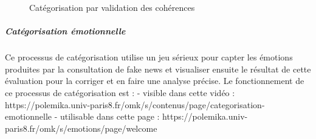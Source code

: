 \documentclass[
  a4paper,
  DIV=11,
  numbers=noendperiod]{scrreprt}
\let\oldsubparagraph\subparagraph
\renewcommand{\subparagraph}[1]{\oldsubparagraph{#1}\mbox{}}
\begin{document}
\begin{figure}


\caption{\label{fig-polemikaReseau}Catégorisation par validation des
cohérences}

\end{figure}%

\subparagraph{Catégorisation
émotionnelle}\label{catuxe9gorisation-uxe9motionnelle}

Ce processus de catégorisation utilise un jeu sérieux pour capter les
émotions produites par la consultation de fake news et visualiser
ensuite le résultat de cette évaluation pour la corriger et en faire une
analyse précise. Le fonctionnement de ce processus de catégorisation est
: - visible dans cette vidéo :
https://polemika.univ-paris8.fr/omk/s/contenus/page/categorisation-emotionnelle
- utilisable dans cette page :
https://polemika.univ-paris8.fr/omk/s/emotions/page/welcome
\end{document}

